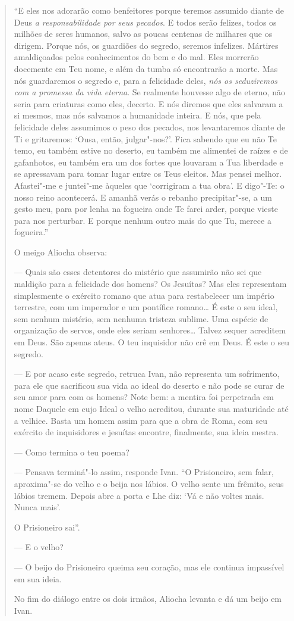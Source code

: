 \begin{quote}
``E eles nos adorarão como benfeitores porque teremos assumido diante de
Deus \emph{a responsabilidade por seus pecados}. E todos serão
felizes, todos os milhões de seres humanos, salvo as poucas centenas de
milhares que os dirigem. Porque nós, os guardiões do segredo, seremos
infelizes. Mártires amaldiçoados pelos conhecimentos do bem e do mal.
Eles morrerão docemente em Teu nome, e além da tumba só encontrarão a
morte. Mas nós guardaremos o segredo e, para a felicidade deles,
\emph{nós os seduziremos com a promessa da vida eterna}. Se realmente
houvesse algo de eterno, não seria para criaturas como eles, decerto. E
nós diremos que eles salvaram a si mesmos, mas nós salvamos a humanidade
inteira. E nós, que pela felicidade deles assumimos o peso dos pecados,
nos levantaremos diante de Ti e gritaremos: `Ousa, então,
julgar"-nos?'. Fica sabendo que eu não Te temo, eu também estive no
deserto, eu também me alimentei de raízes e de gafanhotos, eu também era
um dos fortes que louvaram a Tua liberdade e se apressavam para tomar
lugar entre os Teus eleitos. Mas pensei melhor. Afastei"-me e juntei"-me
àqueles que `corrigiram a tua obra'. E digo"-Te: o nosso reino
acontecerá. E amanhã verás o rebanho precipitar"-se, a um gesto meu, para
por lenha na fogueira onde Te farei arder, porque vieste para nos
perturbar. E porque nenhum outro mais do que Tu, merece a fogueira.''

O meigo Aliocha observa:

--- Quais são esses detentores do mistério que assumirão não sei que
maldição para a felicidade dos homens? Os Jesuítas? Mas eles representam
simplesmente o exército romano que atua para restabelecer um império
terrestre, com um imperador e um pontífice romano\ldots{} É este o seu ideal,
sem nenhum mistério, sem nenhuma tristeza sublime. Uma espécie de
organização de servos, onde eles seriam senhores\ldots{} Talvez sequer
acreditem em Deus. São apenas ateus. O teu inquisidor não crê em Deus. É este o seu
segredo.

--- E por acaso este segredo, retruca Ivan, não representa um sofrimento, para ele que
sacrificou sua vida ao ideal do deserto e não pode se curar de seu amor
para com os homens? Note bem: a mentira foi perpetrada em nome Daquele
em cujo Ideal o velho acreditou, durante sua maturidade até a velhice.
Basta um homem assim para que a obra de Roma, com seu exército de
inquisidores e jesuítas encontre, finalmente, sua ideia mestra.

--- Como termina o teu poema?

--- Pensava terminá"-lo assim, responde Ivan. ``O Prisioneiro, sem falar, aproxima"-se do
velho e o beija nos lábios. O velho sente um frêmito, seus lábios
tremem. Depois abre a porta e Lhe diz: `Vá e não voltes mais. Nunca
mais'.

O Prisioneiro sai''.

--- E o velho?

--- O beijo do Prisioneiro queima seu coração, mas ele continua impassível
em sua ideia.

No fim do diálogo entre os dois irmãos, Aliocha levanta e dá um beijo em
Ivan.
\end{quote}

